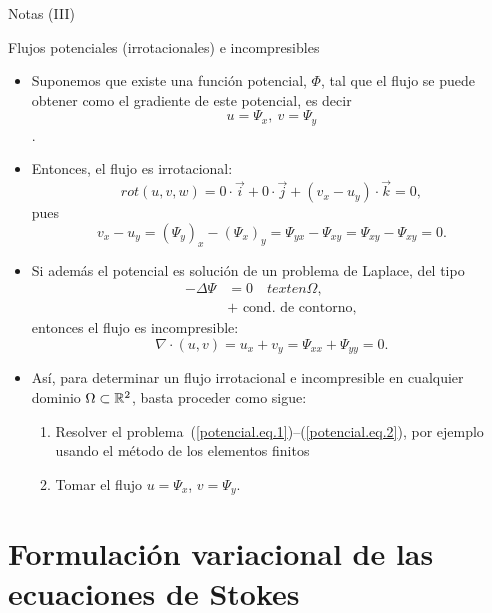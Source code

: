 \documentclass[9pt]{beamer}
\begin{document}
\begin{frame}{Notas (III)}
\end{frame}

\begin{frame}{Flujos potenciales (irrotacionales) e incompresibles}
\begin{itemize}
\item Suponemos que existe una función potencial, $\Phi$, tal que
  el flujo se puede obtener como el gradiente de este potencial, es decir
  $$u=\Psi_x, \ v=\Psi_y$$.
  \item Entonces, el flujo es \alert{irrotacional}:
  $$
  rot(u,v,w) = 0\cdot \vec{i} + 0\cdot \vec j + (v_x - u_y)\cdot \vec k = 0,
  $$
  pues
  $$
  v_x - u_y= (\Psi_{y})_x - (\Psi_{x})_y = \Psi_{yx} - \Psi_{xy}= \Psi_{xy} - \Psi_{xy} =  0.
  $$
\item Si además el potencial es solución de un problema de Laplace, del tipo
  \begin{align}
    \label{potencial.eq.1}
    -\Delta \Psi &= 0 \quad text{ en } \Omega, \\
    \label{potencial.eq.2}
    &+ \text{ cond. de contorno},
  \end{align}
  entonces el flujo es \alert{incompresible}:
  $$
  \nabla\cdot(u,v) = u_x + v_y =\Psi_{xx} + \Psi_{yy} =  0.
  $$
\item Así, para determinar un flujo irrotacional e incompresible en
  cualquier dominio $\Omega\subset{\mathbb R}^2$, basta proceder como sigue:
  \begin{enumerate}
  \item Resolver el
    problema~(\ref{potencial.eq.1})--(\ref{potencial.eq.2}), por
    ejemplo usando el método de los elementos finitos
  \item Tomar el flujo $u=\Psi_x$, $v=\Psi_y$.
  \end{enumerate}


\end{itemize}

\end{frame}

\section{Formulación variacional de las ecuaciones de Stokes}
\end{document}
